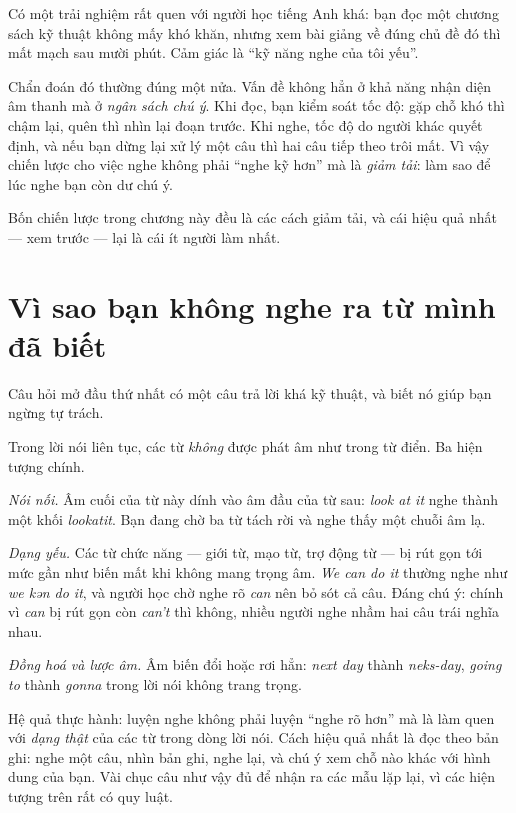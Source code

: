 \documentclass[../../english.tex]{subfiles}
\begin{document}
Có một trải nghiệm rất quen với người học tiếng Anh khá: bạn đọc một chương sách kỹ thuật không mấy khó khăn, nhưng xem bài giảng về đúng chủ đề đó thì mất mạch sau mười phút. Cảm giác là ``kỹ năng nghe của tôi yếu''.

Chẩn đoán đó thường đúng một nửa. Vấn đề không hẳn ở khả năng nhận diện âm thanh mà ở \emph{ngân sách chú ý}. Khi đọc, bạn kiểm soát tốc độ: gặp chỗ khó thì chậm lại, quên thì nhìn lại đoạn trước. Khi nghe, tốc độ do người khác quyết định, và nếu bạn dừng lại xử lý một câu thì hai câu tiếp theo trôi mất. Vì vậy chiến lược cho việc nghe không phải ``nghe kỹ hơn'' mà là \emph{giảm tải}: làm sao để lúc nghe bạn còn dư chú ý.

Bốn chiến lược trong chương này đều là các cách giảm tải, và cái hiệu quả nhất --- xem trước --- lại là cái ít người làm nhất.

\section{Vì sao bạn không nghe ra từ mình đã biết}

Câu hỏi mở đầu thứ nhất có một câu trả lời khá kỹ thuật, và biết nó giúp bạn ngừng tự trách.

Trong lời nói liên tục, các từ \emph{không} được phát âm như trong từ điển. Ba hiện tượng chính.

\emph{Nói nối.} Âm cuối của từ này dính vào âm đầu của từ sau: \emph{look at it} nghe thành một khối \emph{lookatit}. Bạn đang chờ ba từ tách rời và nghe thấy một chuỗi âm lạ.

\emph{Dạng yếu.} Các từ chức năng --- giới từ, mạo từ, trợ động từ --- bị rút gọn tới mức gần như biến mất khi không mang trọng âm. \emph{We can do it} thường nghe như \emph{we kən do it}, và người học chờ nghe rõ \emph{can} nên bỏ sót cả câu. Đáng chú ý: chính vì \emph{can} bị rút gọn còn \emph{can't} thì không, nhiều người nghe nhầm hai câu trái nghĩa nhau.

\emph{Đồng hoá và lược âm.} Âm biến đổi hoặc rơi hẳn: \emph{next day} thành \emph{neks-day}, \emph{going to} thành \emph{gonna} trong lời nói không trang trọng.

Hệ quả thực hành: luyện nghe không phải luyện ``nghe rõ hơn'' mà là làm quen với \emph{dạng thật} của các từ trong dòng lời nói. Cách hiệu quả nhất là đọc theo bản ghi: nghe một câu, nhìn bản ghi, nghe lại, và chú ý xem chỗ nào khác với hình dung của bạn. Vài chục câu như vậy đủ để nhận ra các mẫu lặp lại, vì các hiện tượng trên rất có quy luật.
\end{document}
